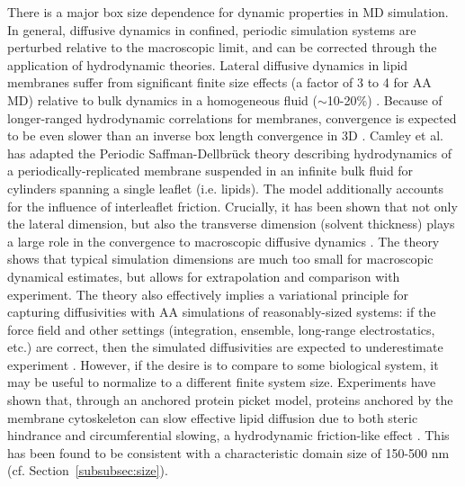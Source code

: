 \documentclass[9pt,bestpractices]{livecoms}
\begin{document}
There is a major box size dependence for dynamic properties in MD simulation.
In general, diffusive dynamics in confined, periodic simulation systems are perturbed relative to the macroscopic limit, and can be corrected through the application of hydrodynamic theories.
Lateral diffusive dynamics in lipid membranes suffer from significant finite size effects (a factor of 3 to 4 for AA MD) \cite{Venable2017,Klauda2006b} relative to bulk dynamics in a homogeneous fluid ($\sim$10-20\%) \cite{Yeh2004c}.
Because of longer-ranged hydrodynamic correlations for membranes, convergence is expected to be even slower than an inverse box length convergence in 3D \cite{Camley2013a}.
Camley et al. has adapted the Periodic Saffman-Dellbr\"uck theory describing hydrodynamics of a periodically-replicated membrane suspended in an infinite bulk fluid for cylinders spanning a single leaflet (i.e. lipids).
The model additionally accounts for the influence of interleaflet friction.
Crucially, it has been shown that not only the lateral dimension, but also the transverse dimension (solvent thickness) plays a large role in the convergence to macroscopic diffusive dynamics \cite{Venable2017}.
The theory shows that typical simulation dimensions are much too small for macroscopic dynamical estimates, but allows for extrapolation and comparison with experiment.
The theory also effectively implies a variational principle for capturing diffusivities with AA simulations of reasonably-sized systems: if the force field and other settings (integration, ensemble, long-range electrostatics, etc.) are correct, then the simulated diffusivities are expected to underestimate experiment \cite{Venable2017}.
However, if the desire is to compare to some biological system, it may be useful to normalize to a different finite system size.
Experiments have shown that, through an anchored protein picket model, proteins anchored by the membrane cytoskeleton can slow effective lipid diffusion due to both steric hindrance and circumferential slowing, a hydrodynamic friction-like effect \cite{Morone2006}.
This has been found to be consistent with a characteristic domain size of 150-500 nm \cite{Ritchie2003,Morone2006} (cf. Section~\ref{subsubsec:size}).
\end{document}

